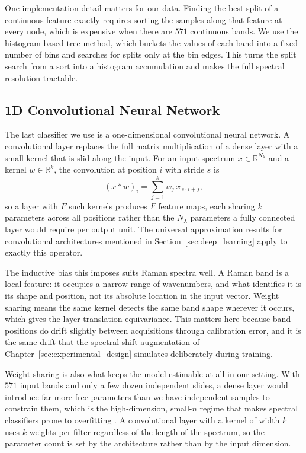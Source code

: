 One implementation detail matters for our data. Finding the best split of a continuous feature
exactly requires sorting the samples along that feature at every node, which is expensive when
there are $571$ continuous bands. We use the histogram-based tree method, which buckets the
values of each band into a fixed number of bins and searches for splits only at the bin edges.
This turns the split search from a sort into a histogram accumulation and makes the full
spectral resolution tractable.


\subsection*{1D Convolutional Neural Network}

The last classifier we use is a one-dimensional convolutional neural network. A convolutional
layer replaces the full matrix multiplication of a dense layer with a small kernel that is slid
along the input. For an input spectrum $x \in \mathbb{R}^{N_\lambda}$ and a kernel
$w \in \mathbb{R}^{k}$, the convolution at position $i$ with stride $s$ is
\begin{equation}
(x * w)_i = \sum_{j=1}^{k} w_j \, x_{\,s \cdot i + j},
\label{eq:conv1d}
\end{equation}
so a layer with $F$ such kernels produces $F$ feature maps, each sharing $k$ parameters across
all positions rather than the $N_\lambda$ parameters a fully connected layer would require per
output unit. The universal approximation results for convolutional architectures mentioned in
Section~\ref{sec:deep_learning} \cite{Zhou2020, Yarotsky2018} apply to exactly this operator.

The inductive bias this imposes suits Raman spectra well. A Raman band is a local feature: it
occupies a narrow range of wavenumbers, and what identifies it is its shape and position, not
its absolute location in the input vector. Weight sharing means the same kernel detects the
same band shape wherever it occurs, which gives the layer translation equivariance. This
matters here because band positions do drift slightly between acquisitions through calibration
error, and it is the same drift that the spectral-shift augmentation of
Chapter~\ref{sec:experimental_design} simulates deliberately during training.

Weight sharing is also what keeps the model estimable at all in our setting. With $571$ input
bands and only a few dozen independent slides, a dense layer would introduce far more free
parameters than we have independent samples to constrain them, which is the high-dimension,
small-$n$ regime that makes spectral classifiers prone to overfitting
\cite{berisha2021overfitting, subramanian2013overfitting}. A convolutional layer with a kernel
of width $k$ uses $k$ weights per filter regardless of the length of the spectrum, so the
parameter count is set by the architecture rather than by the input dimension.


